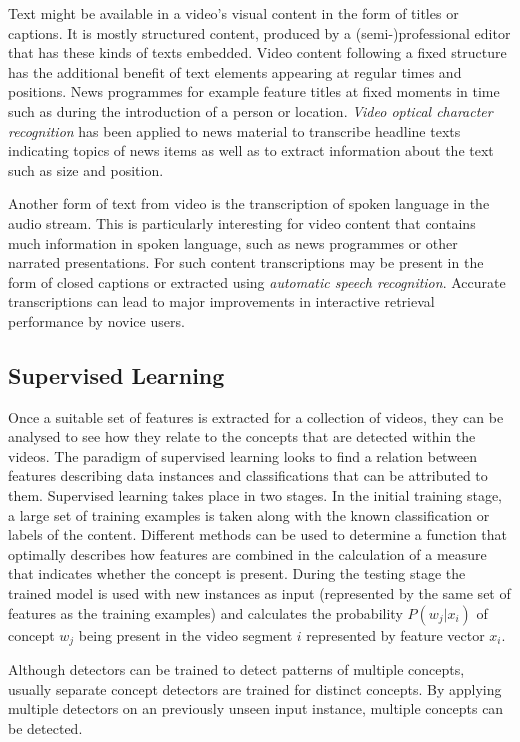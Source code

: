 Text might be available in a video's visual content in the form of titles or captions. It is mostly structured content, produced by a (semi-)professional editor that has these kinds of texts embedded. Video content following a fixed structure has the additional benefit of text elements appearing at regular times and positions. News programmes for example feature titles at fixed moments in time such as during the introduction of a person or location. \emph{Video optical character recognition} has been applied to news material to transcribe headline texts indicating topics of news items as well as to extract information about the text such as size and position\cite{Kuwano:2000wy}.

Another form of text from video is the transcription of spoken language in the audio stream. This is particularly interesting for video content that contains much information in spoken language, such as news programmes or other narrated presentations. For such content transcriptions may be present in the form of closed captions or extracted using \emph{automatic speech recognition}. Accurate transcriptions can lead to major improvements in interactive retrieval performance by novice users\cite{Christel:2005td}.

\subsection{Supervised Learning}

Once a suitable set of features is extracted for a collection of videos, they can be analysed to see how they relate to the concepts that are detected within the videos. The paradigm of supervised learning looks to find a relation between features describing data instances and classifications that can be attributed to them. Supervised learning takes place in two stages. In the initial training stage, a large set of training examples is taken along with the known classification or labels of the content.  Different methods can be used to determine a function that optimally describes how features are combined in the calculation of a measure that indicates whether the concept is present. During the testing stage the trained model is used with new instances as input (represented by the same set of features as the training examples) and calculates the probability $P(w_j | x_i)$ of concept $w_j$ being present in the video segment $i$ represented by feature vector $x_i$.

Although detectors can be trained to detect patterns of multiple concepts, usually separate concept detectors are trained for distinct concepts. By applying multiple detectors on an previously unseen input instance, multiple concepts can be detected.


